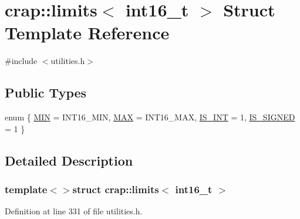 \hypertarget{structcrap_1_1limits_3_01int16__t_01_4}{\section{crap\+:\+:limits$<$ int16\+\_\+t $>$ Struct Template Reference}
\label{structcrap_1_1limits_3_01int16__t_01_4}
}


{\ttfamily \#include $<$utilities.\+h$>$}

\subsection*{Public Types}
\begin{DoxyCompactItemize}
\item 
enum \{ \hyperlink{structcrap_1_1limits_3_01int16__t_01_4_acd0c1d8d992c9f6f40ebba24108a5880a1de03cf78457841a6f3c7480dfad60a2}{M\+I\+N} = I\+N\+T16\+\_\+\+M\+I\+N, 
\hyperlink{structcrap_1_1limits_3_01int16__t_01_4_acd0c1d8d992c9f6f40ebba24108a5880aed380ff9e38962978a1ed0e3dbb287e8}{M\+A\+X} = I\+N\+T16\+\_\+\+M\+A\+X, 
\hyperlink{structcrap_1_1limits_3_01int16__t_01_4_acd0c1d8d992c9f6f40ebba24108a5880a075153b3e346cc6ed4d750497e392942}{I\+S\+\_\+\+I\+N\+T} = 1, 
\hyperlink{structcrap_1_1limits_3_01int16__t_01_4_acd0c1d8d992c9f6f40ebba24108a5880a245868bae7493a2fa5764af28a1ffc3d}{I\+S\+\_\+\+S\+I\+G\+N\+E\+D} = 1
 \}
\end{DoxyCompactItemize}


\subsection{Detailed Description}
\subsubsection*{template$<$$>$struct crap\+::limits$<$ int16\+\_\+t $>$}



Definition at line 331 of file utilities.\+h.



